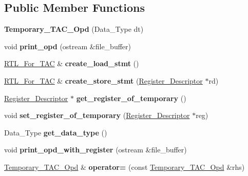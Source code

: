 \subsection*{Public Member Functions}
\begin{DoxyCompactItemize}
\item 
\mbox{\label{classTemporary__TAC__Opd_aa72afad38af5bdb6f15a2e8b7bc65b9b}} 
{\bfseries Temporary\+\_\+\+T\+A\+C\+\_\+\+Opd} (Data\+\_\+\+Type dt)
\item 
\mbox{\label{classTemporary__TAC__Opd_ab5248a002046628e1c0d2787ced9300c}} 
void {\bfseries print\+\_\+opd} (ostream \&file\+\_\+buffer)
\item 
\mbox{\label{classTemporary__TAC__Opd_a9bdda423156c6753385cb0fca3583b63}} 
\hyperlink{classRTL__For__TAC}{R\+T\+L\+\_\+\+For\+\_\+\+T\+AC} \& {\bfseries create\+\_\+load\+\_\+stmt} ()
\item 
\mbox{\label{classTemporary__TAC__Opd_a96f3a34f5adab0a13ec21e689afbd872}} 
\hyperlink{classRTL__For__TAC}{R\+T\+L\+\_\+\+For\+\_\+\+T\+AC} \& {\bfseries create\+\_\+store\+\_\+stmt} (\hyperlink{classRegister__Descriptor}{Register\+\_\+\+Descriptor} $\ast$rd)
\item 
\mbox{\label{classTemporary__TAC__Opd_a910ab0f540f698c9b29bc74014c24b8b}} 
\hyperlink{classRegister__Descriptor}{Register\+\_\+\+Descriptor} $\ast$ {\bfseries get\+\_\+register\+\_\+of\+\_\+temporary} ()
\item 
\mbox{\label{classTemporary__TAC__Opd_aee9e5c4cc0c66255120cceb28151922c}} 
void {\bfseries set\+\_\+register\+\_\+of\+\_\+temporary} (\hyperlink{classRegister__Descriptor}{Register\+\_\+\+Descriptor} $\ast$reg)
\item 
\mbox{\label{classTemporary__TAC__Opd_a2e210e03f29ed2fa44317e6777b2cece}} 
Data\+\_\+\+Type {\bfseries get\+\_\+data\+\_\+type} ()
\item 
\mbox{\label{classTemporary__TAC__Opd_a8a4857b3dc7ecf04678ee67e9710959a}} 
void {\bfseries print\+\_\+opd\+\_\+with\+\_\+register} (ostream \&file\+\_\+buffer)
\item 
\mbox{\label{classTemporary__TAC__Opd_a9203e8c66b87e150ce19389444703abf}} 
\hyperlink{classTemporary__TAC__Opd}{Temporary\+\_\+\+T\+A\+C\+\_\+\+Opd} \& {\bfseries operator=} (const \hyperlink{classTemporary__TAC__Opd}{Temporary\+\_\+\+T\+A\+C\+\_\+\+Opd} \&rhs)
\end{DoxyCompactItemize}
